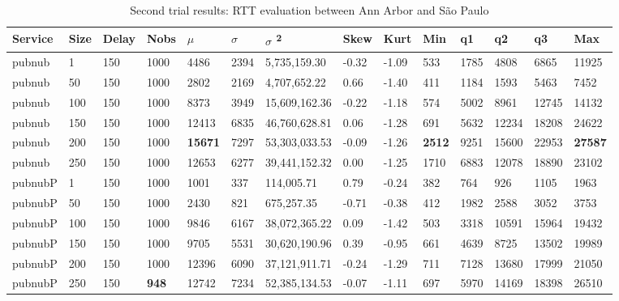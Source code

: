\begin{table}[!htb]
	\footnotesize
	\centering
	\caption{Second trial results: RTT evaluation between Ann Arbor and São Paulo}
	\label{tab:secondtrialarbsao}
	\begin{tabular}{llllllllllllll}
		Service    & Size & Delay & Nobs & $\mu$ & $\sigma$  & $\sigma$ \textsuperscript{2} & Skew & Kurt & Min & q1   & q2   & q3   & Max   \\ \midrule
		pubnub     & 1            & 150   & 1000 & 4486  & 2394 & 5,735,159.30  & -0.32    & -1.09    & 533  & 1785 & 4808  & 6865  & 11925 \\
		pubnub     & 50           & 150   & 1000 & 2802  & 2169 & 4,707,652.22  & 0.66     & -1.40    & 411  & 1184 & 1593  & 5463  & 7452  \\
		pubnub     & 100          & 150   & 1000 & 8373  & 3949 & 15,609,162.36 & -0.22    & -1.18    & 574  & 5002 & 8961  & 12745 & 14132 \\
		pubnub     & 150          & 150   & 1000 & 12413 & 6835 & 46,760,628.81 & 0.06     & -1.28    & 691  & 5632 & 12234 & 18208 & 24622 \\
		pubnub     & 200          & 150   & 1000 & \textbf{15671} & 7297 & 53,303,033.53 & -0.09    & -1.26    & \textbf{2512} & 9251 & 15600 & 22953 & \textbf{27587} \\
		pubnub     & 250          & 150   & 1000 & 12653 & 6277 & 39,441,152.32 & 0.00     & -1.25    & 1710 & 6883 & 12078 & 18890 & 23102 \\ \hline
		pubnubP & 1            & 150   & 1000 & 1001  & 337  & 114,005.71    & 0.79     & -0.24    & 382  & 764  & 926   & 1105  & 1963  \\
		pubnubP & 50           & 150   & 1000 & 2430  & 821  & 675,257.35    & -0.71    & -0.38    & 412  & 1982 & 2588  & 3052  & 3753  \\
		pubnubP & 100          & 150   & 1000 & 9846  & 6167 & 38,072,365.22 & 0.09     & -1.42    & 503  & 3318 & 10591 & 15964 & 19432 \\
		pubnubP & 150          & 150   & 1000 & 9705  & 5531 & 30,620,190.96 & 0.39     & -0.95    & 661  & 4639 & 8725  & 13502 & 19989 \\
		pubnubP & 200          & 150   & 1000 & 12396 & 6090 & 37,121,911.71 & -0.24    & -1.29    & 711  & 7128 & 13680 & 17999 & 21050 \\
		pubnubP & 250          & 150   & \textbf{948}  & 12742 & 7234 & 52,385,134.53 & -0.07    & -1.11    & 697  & 5970 & 14169 & 18398 & 26510 \\ \hline

\end{tabular}
\end{table}
